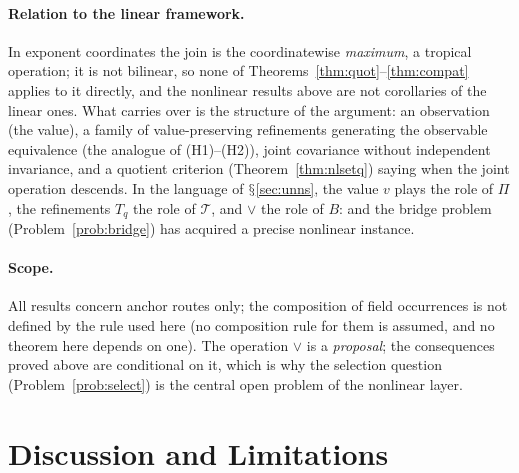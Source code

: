\documentclass[11pt,a4paper]{article}
\renewcommand{\S}{\ensuremath{\mathsection}}
\newcommand{\vj}{\mathbin{\vee}}
\theoremstyle{plain}
\theoremstyle{definition}
\begin{document}
\paragraph{Relation to the linear framework.}
In exponent coordinates the join is the coordinatewise \emph{maximum}, a tropical operation; it is not bilinear, so none of Theorems~\ref{thm:quot}--\ref{thm:compat} applies to it directly, and the nonlinear results above are not corollaries of the linear ones. What carries over is the structure of the argument: an observation (the value), a family of value-preserving refinements generating the observable equivalence (the analogue of (H1)--(H2)), joint covariance without independent invariance, and a quotient criterion (Theorem~\ref{thm:nlsetq}) saying when the joint operation descends. In the language of \S\ref{sec:unns}, the value $v$ plays the role of $\Pi$, the refinements $T_q$ the role of $\mathcal T$, and $\vj$ the role of $B$: and the bridge problem (Problem~\ref{prob:bridge}) has acquired a precise nonlinear instance.
\paragraph{Scope.}
All results concern anchor routes only; the composition of field occurrences is not defined by the rule used here (no composition rule for them is assumed, and no theorem here depends on one). The operation $\vj$ is a \emph{proposal}; the consequences proved above are conditional on it, which is why the selection question (Problem~\ref{prob:select}) is the central open problem of the nonlinear layer.

\section{Discussion and Limitations}\label{sec:discussion}
\end{document}
